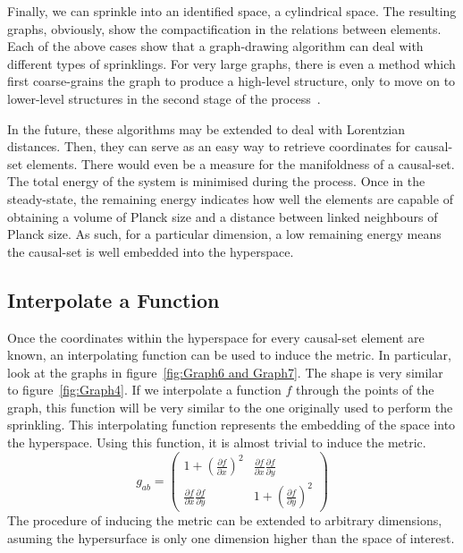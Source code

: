 \documentclass[a4paper,12pt]{article}
\numberwithin{equation}{section}
\begin{document}
Finally, we can sprinkle into an identified space, a cylindrical space. The resulting graphs, obviously, show the compactification in the relations between elements. Each of the above cases show that a graph-drawing algorithm can deal with different types of sprinklings. For very large graphs, there is even a method which first coarse-grains the graph to produce a high-level structure, only to move on to lower-level structures in the second stage of the process~\cite{Hu2005}.

In the future, these algorithms may be extended to deal with Lorentzian distances. Then, they can serve as an easy way to retrieve coordinates for causal-set elements. There would even be a measure for the manifoldness of a causal-set. The total energy of the system is minimised during the process. Once in the steady-state, the remaining energy indicates how well the elements are capable of obtaining a volume of Planck size and a distance between linked neighbours of Planck size. As such, for a particular dimension, a low remaining energy means the causal-set is well embedded into the hyperspace.


\subsection{Interpolate a Function}
\label{sec:Interpolate a Function}

Once the coordinates within the hyperspace for every causal-set element are known, an interpolating function can be used to induce the metric. In particular, look at the graphs in figure~\ref{fig:Graph6 and Graph7}. The shape is very similar to figure~\ref{fig:Graph4}. If we interpolate a function $f$ through the points of the graph, this function will be very similar to the one originally used to perform the sprinkling. This interpolating function represents the embedding of the space into the hyperspace. Using this function, it is almost trivial to induce the metric.
\begin{equation}
\label{eq:Induced Metric}
g_{ab}=\left(\begin{array}{cc}
1+(\frac{\partial f}{\partial x})^2 & \frac{\partial f}{\partial x}\frac{\partial f}{\partial y}\\
\frac{\partial f}{\partial x}\frac{\partial f}{\partial y} & 1+(\frac{\partial f}{\partial y})^2
\end{array}\right)
\end{equation}
The procedure of inducing the metric can be extended to arbitrary dimensions, asuming the hypersurface is only one dimension higher than the space of interest.
\end{document}
